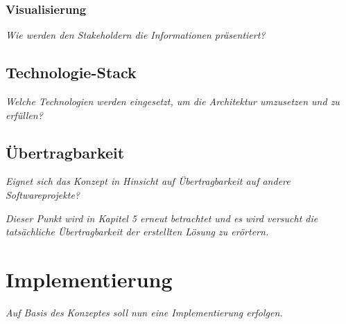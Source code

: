 		\subsubsection{Visualisierung}
		\textit{Wie werden den Stakeholdern die Informationen präsentiert?}

	\subsection{Technologie-Stack}

	\textit{Welche Technologien werden eingesetzt, um die Architektur umzusetzen und zu erfüllen?}

	\subsection{Übertragbarkeit}

	\textit{Eignet sich das Konzept in Hinsicht auf Übertragbarkeit auf andere Softwareprojekte?}

	\textit{Dieser Punkt wird in Kapitel 5 erneut betrachtet und es wird versucht die tatsächliche Übertragbarkeit der erstellten Lösung zu erörtern.}

\section{Implementierung}

	\textit{Auf Basis des Konzeptes soll nun eine Implementierung erfolgen.}
